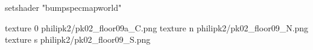 setshader "bumpspecmapworld"

texture 0 philipk2/pk02_floor09a_C.png
texture n philipk2/pk02_floor09_N.png
texture s philipk2/pk02_floor09_S.png


